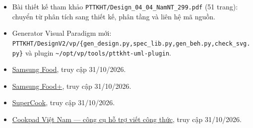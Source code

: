\begin{itemize}
\item [L6] Bài thiết kế tham khảo {\small\texttt{PTTKHT/\allowbreak{}\allowbreak{}Design\_\allowbreak{}\allowbreak{}04\_\allowbreak{}\allowbreak{}04\_\allowbreak{}\allowbreak{}NamNT\_\allowbreak{}\allowbreak{}299.\allowbreak{}pdf}} (51 trang): chuyển từ phân tích sang thiết kế, phân tầng và liên hệ mã nguồn.
\item [G1] Generator Visual Paradigm mới: {\small\texttt{PTTKHT/\allowbreak{}\allowbreak{}DesignV2/\allowbreak{}\allowbreak{}vp/\allowbreak{}\allowbreak{}\{gen\_\allowbreak{}\allowbreak{}design.\allowbreak{}py,spec\_\allowbreak{}\allowbreak{}lib.\allowbreak{}py,gen\_\allowbreak{}\allowbreak{}beh.\allowbreak{}py,check\_\allowbreak{}\allowbreak{}svg.\allowbreak{}py\}}} và plugin {\small\texttt{\textasciitilde{}/\allowbreak{}\allowbreak{}opt/\allowbreak{}\allowbreak{}vp/\allowbreak{}\allowbreak{}tools/\allowbreak{}\allowbreak{}pttkht-\allowbreak{}uml-\allowbreak{}plugin}}.
\item [W1] \href{https://samsungfood.com/}{Samsung Food}, truy cập 31/\allowbreak{}10/\allowbreak{}2026.
\item [W2] \href{https://samsungfood.com/food-plus/}{Samsung Food+}, truy cập 31/\allowbreak{}10/\allowbreak{}2026.
\item [W3] \href{https://www.supercook.com/}{SuperCook}, truy cập 31/\allowbreak{}10/\allowbreak{}2026.
\item [W4] \href{https://blog.cookpad.com/vn/tinh-nang-tro-ly-ai-viet-cong-thuc-nhanh-hon/}{Cookpad Việt Nam --- công cụ hỗ trợ viết công thức}, truy cập 31/\allowbreak{}10/\allowbreak{}2026.
\end{itemize}

